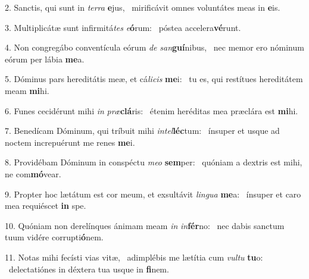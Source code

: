 2. Sanctis, qui sunt in \textit{ter}\textit{ra} \textbf{e}jus, \ast\  mirificávit omnes voluntátes meas in \textbf{e}is.\

3. Multiplicátæ sunt infirmitá\textit{tes} \textit{e}\textbf{ó}rum: \ast\  póstea accelera\textbf{vé}runt.\

4. Non congregábo conventícula eórum \textit{de} \textit{san}\textbf{guí}nibus, \ast\  nec memor ero nóminum eórum per lábia \textbf{me}a.\

5. Dóminus pars hereditátis meæ, et cá\textit{li}\textit{cis} \textbf{me}i: \ast\  tu es, qui restítues hereditátem meam \textbf{mi}hi.\

6. Funes cecidérunt mihi \textit{in} \textit{præ}\textbf{clá}ris: \ast\  étenim heréditas mea præclára est \textbf{mi}hi.\

7. Benedícam Dóminum, qui tríbuit mihi \textit{in}\textit{tel}\textbf{léc}tum: \ast\  ínsuper et usque ad noctem increpuérunt me renes \textbf{me}i.\

8. Providébam Dóminum in conspéctu \textit{me}\textit{o} \textbf{sem}per: \ast\  quóniam a dextris est mihi, ne com\textbf{mó}vear.\

9. Propter hoc lætátum est cor meum, et exsultávit \textit{lin}\textit{gua} \textbf{me}a: \ast\  ínsuper et caro mea requiéscet \textbf{in} spe.\

10. Quóniam non derelínques ánimam meam \textit{in} \textit{in}\textbf{fér}no: \ast\  nec dabis sanctum tuum vidére corrupti\textbf{ó}nem.\

11. Notas mihi fecísti vias vitæ, \dag\  adimplébis me lætítia cum \textit{vul}\textit{tu} \textbf{tu}o: \ast\  delectatiónes in déxtera tua usque in \textbf{fi}nem.\


